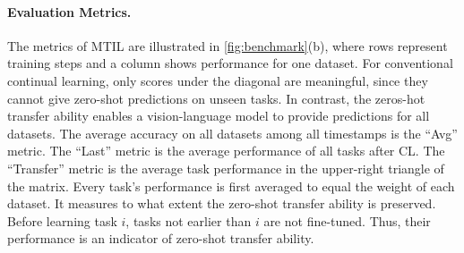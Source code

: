 \begin{table}[t]
\centering
\caption{Ablation study of different components for ZSCL.}
\label{tab:pablate}
\resizebox{\columnwidth}{!}{%
\begin{tabular}{@{}lcc|cc|cc@{}}
\toprule
Method & Transfer & $\Delta$ & Avg. & $\Delta$ & Last & $\Delta$  \\ \midrule
CLIP \texttt{ViT-B/16@224px}  & & & & & & \\
\quad Zero-shot  & \baseline{69.4} &  \baseline{0.0} & \baseline{65.3} & \baseline{0.0} & \baseline{65.3} & \baseline{0.0} \\
\quad Continual Learning & 44.6 & \red{-24.8} & 55.9 & \red{-9.4} & 77.3 & \gre{+12.0} \\
\quad + Distillation & 58.9 & \red{-10.5} & 70.5 & \gre{+5.2} & 83.8 & \gre{+18.5}  \\
\quad \quad + WiSE-FT (best $\alpha$) & 61.7 & \red{-7.7} & 71.6 & \gre{+6.3} & 83.3 & \gre{+18.0}\\
\quad \quad + WE (ZSCL$^*$) & 62.2 & \red{-7.2} & 72.6 & \gre{+7.3} & \textbf{84.5} & \gre{\textbf{+19.2}} \\
\quad \quad + WC & 67.6 & \red{-1.8} & 74.5 & \gre{+9.2} & 83.2 & \gre{+17.9}\\
\quad \quad \quad + WiSE-FT & 67.7 & \red{-1.7} & 74.2 & \gre{+8.9} & 81.9 & \gre{+16.6} \\
\quad \quad \quad + WE (ZSCL) & \textbf{68.1} & \red{\textbf{-1.3}} & \textbf{75.4} & \gre{\textbf{+10.1}} & 83.6 & \gre{+18.3} \\
\bottomrule
\end{tabular}%
}
\end{table}


\paragraph{Evaluation Metrics.} The metrics of MTIL are illustrated in \cref{fig:benchmark}(b), where rows represent training steps and a column shows performance for one dataset.
For conventional continual learning, only scores under the diagonal are meaningful, since they cannot give zero-shot predictions on unseen tasks. In contrast, the zeros-hot transfer ability enables a vision-language model to provide predictions for all datasets. The average accuracy on all datasets among all timestamps is the ``Avg'' metric. The ``Last'' metric is the average performance of all tasks after CL. The ``Transfer'' metric is the average task performance in the upper-right triangle of the matrix. Every task's performance is first averaged to equal the weight of each dataset. It measures to what extent the zero-shot transfer ability is preserved. Before learning task $i$, tasks not earlier than $i$ are not fine-tuned. Thus, their performance is an indicator of zero-shot transfer ability. 